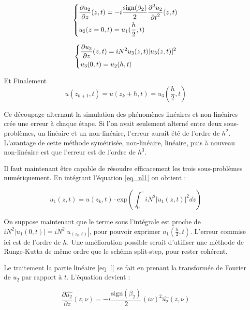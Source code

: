 \documentclass{article}
\begin{document}
\begin{equation}
  \begin{dcases*}
    \frac{\partial u_2}{\partial z}(z, t) = - i\frac{\text{sign}(\beta_2)}{2} \frac{\partial^2 u_2}{{\partial t}^2}(z, t) \\
    u_2(z=0, t) = u_1(\frac{h}{2}, t) 
\end{dcases*}
  \label{eq_l}
\end{equation}

\begin{equation}
  \begin{dcases*}
    \frac{\partial u_3}{\partial z}(z, t) =   iN^2u_3(z, t)|u_3(z, t)|^2\\
    u_3(0, t) = u_2(h, t) 
  \end{dcases*}
  \label{eq_nl2}
\end{equation}

Et Finalement
\begin{equation*}
  u(z_{k+1}, t) = u(z_k + h, t) = u_3(\frac{h}{2}, t)
\end{equation*}

Ce découpage alternant la simulation des phénomènes linéaires et non-linéaires crée une erreur à chaque étape. Si l'on avait seulement alterné entre deux sous-problèmes, un linéaire et un non-linéaire, l'erreur aurait été de l'ordre de $h^2$. L'avantage de cette méthode symétrisée, non-linéaire, linéaire, puis à nouveau non-linéaire est que l'erreur est de l'ordre de $h^3$.

Il faut maintenant être capable de résoudre efficacement les trois sous-problèmes numériquement.
En intégrant l'équation \eqref{eq_nl1} on obtient :

\begin{equation}
  u_1(z, t) =  u(z_k, t)\cdot \text{exp}\left(\int_{0}^ziN^2|u_1(z, t)|^2dz\right)
  \label{eq:int_nl1}
\end{equation}

On suppose maintenant que le terme sous l'intégrale est proche de $iN^2|u_1(0, t)| = iN^2|u_(z_k, t)|$, pour pouvoir exprimer $u_1(\frac{h}{2}, t)$. L'erreur commise ici est de l'ordre de $h$. Une amélioration possible serait d'utiliser une méthode de Runge-Kutta de même ordre que le schéma split-step, pour rester cohérent.

Le traitement la partie linéaire \eqref{eq_l} se fait en prenant la transformée de Fourier de $u_2$ par rapport à $t$. L'équation devient :

\begin{equation*}
  \frac{\partial \hat{u_2}}{\partial z}(z, \nu) = - i\frac{\text{sign}(\beta_2)}{2} (i\nu)^2\hat{u_2}(z, \nu) 
\end{equation*}
\end{document}

